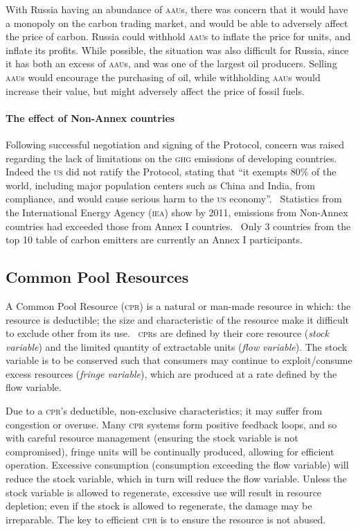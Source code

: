 With Russia having an abundance of \textsc{aau}s, there was concern that it would have a monopoly on the carbon trading market, and would be able to adversely affect the price of carbon. Russia could withhold \textsc{aau}s to inflate the price for units, and inflate its profits. While possible, the situation was also difficult for Russia, since it has both an excess of \textsc{aau}s, and was one of the largest oil producers. Selling \textsc{aau}s would encourage the purchasing of oil, while withholding \textsc{aau}s would increase their value, but might adversely affect the price of fossil fuels.

\paragraph{The effect of Non-Annex countries}

Following successful negotiation and signing of the Protocol, concern was raised regarding the lack of limitations on the \textsc{ghg} emissions of developing countries. Indeed the \textsc{us} did not ratify the Protocol, stating that ``it exempts 80\% of the world, including major population centers such as China and India, from compliance, and would cause serious harm to the \textsc{us} economy''.~\cite{Hague-to-Marrakesh} Statistics from the International Energy Agency (\textsc{iea}) show by 2011, emissions from Non-Annex countries had exceeded those from Annex I countries.~\cite{IEA-highlights} Only 3 countries from the top 10 table of carbon emitters are currently an Annex I participants.

\subsection{Common Pool Resources}

A Common Pool Resource (\textsc{cpr}) is a natural or man-made resource in which: the resource is deductible; the size and characteristic of the resource make it difficult to exclude other from its use.~\cite{Ostrom-90} \textsc{cpr}s are defined by their core resource (\emph{stock variable}) and the limited quantity of extractable units (\emph{flow variable}). The stock variable is to be conserved such that consumers may continue to exploit/consume excess resources (\emph{fringe variable}), which are produced at a rate defined by the flow variable.

Due to a \textsc{cpr}'s deductible, non-exclusive characteristics; it may suffer from congestion or overuse. Many \textsc{cpr} systems form positive feedback loops, and so with careful resource management (ensuring the stock variable is not compromised), fringe units will be continually produced, allowing for efficient operation. Excessive consumption (consumption exceeding the flow variable) will reduce the stock variable, which in turn will reduce the flow variable. Unless the stock variable is allowed to regenerate, excessive use will result in resource depletion; even if the stock is allowed to regenerate, the damage may be irreparable. The key to efficient \textsc{cpr} is to ensure the resource is not abused.

